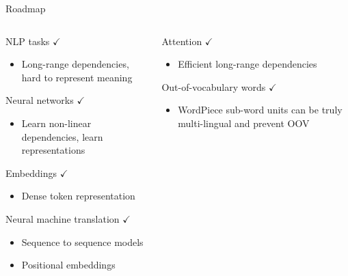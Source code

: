 \documentclass[12pt,aspectratio=169,handout]{beamer}
\begin{document}
\begin{frame}{Roadmap}
	
	\begin{columns}
		
		\begin{column}{0.5\linewidth}
			
			
			NLP tasks $\checkmark$
			
			\begin{itemize}
				\item {\scriptsize Long-range dependencies, hard to represent meaning}
			\end{itemize}
			
			Neural networks $\checkmark$
			
			\begin{itemize}
				\item {\scriptsize Learn non-linear dependencies, learn representations}
			\end{itemize}
			
			Embeddings $\checkmark$
			
			\begin{itemize}
				\item {\scriptsize Dense token representation}
			\end{itemize}
			
			Neural machine translation $\checkmark$
			
			\begin{itemize}
				\item {\scriptsize Sequence to sequence models}
				\item {\scriptsize Positional embeddings}
			\end{itemize}
			
		\end{column}
		
		\begin{column}{0.5\linewidth}
			
			Attention $\checkmark$
			
			\begin{itemize}
				\item {\scriptsize Efficient long-range dependencies}
			\end{itemize}
			
			
			Out-of-vocabulary words $\checkmark$
			
			\begin{itemize}
				\item {\scriptsize WordPiece sub-word units can be truly multi-lingual and prevent OOV}
			\end{itemize}
			

\end{column}
\end{columns}
\end{frame}
\end{document}
